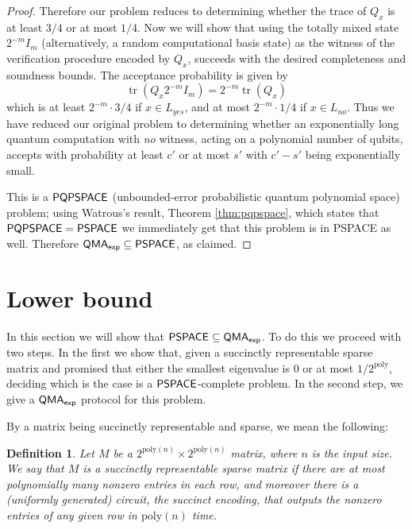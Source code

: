 \documentclass[11pt]{article}
\newtheorem{definition}{Definition}
\theoremstyle{definition}
\theoremstyle{remark}
\newcommand\PSPACE{{\sf{PSPACE}}}
\newcommand\QMAexp{{\sf{QMA}_{exp}}}
\newcommand\PQPSPACE{{\sf{PQPSPACE}}}
\DeclareMathOperator{\tr}{tr}
\newcommand{\poly}{\textrm{poly}}
\begin{document}
\begin{proof}
Therefore our problem reduces to determining whether the trace of $Q_x$ is at least $3/4$ or at most $1/4$.  Now we will show that using the totally mixed state $2^{-m}I_m$ (alternatively, a random computational basis state) as the witness of the verification procedure encoded by $Q_x$, succeeds with the desired completeness and soundness bounds.  The acceptance probability is given by
\begin{equation}
\tr(Q_x 2^{-m}I_m) = 2^{-m} \tr(Q_x)
\end{equation}
which is at least $2^{-m} \cdot 3/4$ if $x\in L_{yes}$, and at most $2^{-m} \cdot 1/4$ if $x\in L_{no}$. Thus we have reduced our original problem to determining whether an exponentially long quantum computation with \emph{no} witness, acting on a polynomial number of qubits, accepts with probability at least $c'$ or at most $s'$ with $c' - s'$ being exponentially small. 

This is a $\PQPSPACE$ (unbounded-error probabilistic quantum polynomial space) problem; using Watrous's result, Theorem \ref{thm:pqpspace}, which states that $\PQPSPACE=\PSPACE$ we immediately get that this problem is in PSPACE as well. Therefore $\QMAexp \subseteq \PSPACE$, as claimed.


\end{proof}

\section{Lower bound}
In this section we will show that $\PSPACE\subseteq\QMAexp$.  To do this we proceed with two steps.  In the first we show that, given a succinctly representable sparse matrix and promised that either the smallest eigenvalue is 0 or at most $1/2^{\poly}$, deciding which is the case is a $\PSPACE$-complete problem.  In the second step, we give a $\QMAexp$ protocol for this problem.

By a matrix being succinctly representable and sparse, we mean the following:
\begin{definition}
Let $M$ be a $2^{\poly(n)} \times 2^{\poly(n)}$ matrix, where $n$ is the input size. We say that $M$ is a \emph{succinctly representable sparse} matrix if there are at most polynomially many nonzero entries in each row, and moreover there is a (uniformly generated) circuit, \emph{the succinct encoding}, that outputs the nonzero entries of any given row in $\poly(n)$ time.
\end{definition}
\end{document}
